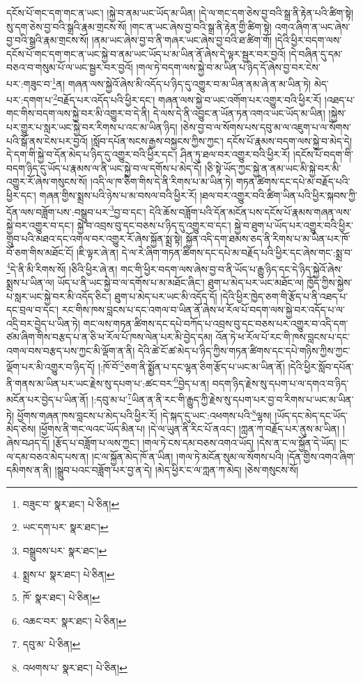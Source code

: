 དངོས་པོ་གང་དག་གང་ན་ཡང་། །སྐྱེ་བ་ནམ་ཡང་ཡོད་མ་ཡིན། །དེ་ལ་གང་དག་ཅེས་བྱ་བའི་སྒྲ་ནི་རྟེན་པའི་ཚིག་སྟེ། སུ་དག་ཅེས་བྱ་བའི་སྒྲའི་རྣམ་གྲངས་སོ། །གང་ན་ཡང་ཞེས་བྱ་བའི་སྒྲ་ནི་རྟེན་གྱི་ཚིག་སྟེ། འགའ་ཞིག་ན་ཡང་ཞེས་བྱ་བའི་སྒྲའི་རྣམ་གྲངས་སོ། །ནམ་ཡང་ཞེས་བྱ་བ་ནི་གཞར་ཡང་ཞེས་བྱ་བའི་ཐ་ཚིག་གོ། །དེའི་ཕྱིར་བདག་ལས་དངོས་པོ་གང་དག་གང་ན་ཡང་སྐྱེ་བ་ནམ་ཡང་ཡོད་པ་མ་ཡིན་ནོ་ཞེས་དེ་ལྟར་སྦྱར་བར་བྱའོ། །དེ་བཞིན་དུ་དམ་བཅའ་བ་གསུམ་པོ་ལ་ཡང་སྦྱར་བར་བྱའོ། །གལ་ཏེ་བདག་ལས་སྐྱེ་བ་མ་ཡིན་པ་ཉིད་དོ་ཞེས་བྱ་བར་ངེས་པར་:གཟུང་བ་\footnote{བཟུང་བ་  སྣར་ཐང་།  པེ་ཅིན། }ན། གཞན་ལས་སྐྱེའོ་ཞེས་མི་འདོད་པ་ཉིད་དུ་འགྱུར་བ་མ་ཡིན་ནམ་ཞེ་ན་མ་ཡིན་ཏེ། མེད་པར་:དགག་པ་\footnote{ཡང་དག་པར་  སྣར་ཐང་། }བརྗོད་པར་འདོད་པའི་ཕྱིར་དང་། གཞན་ལས་སྐྱེ་བ་ཡང་འགོག་པར་འགྱུར་བའི་ཕྱིར་རོ། །འཐད་པ་གང་གིས་བདག་ལས་སྐྱེ་བར་མི་འགྱུར་བ་དེ་ནི། དེ་ལས་དེ་ནི་འབྱུང་ན་ཡོན་ཏན་འགའ་ཡང་ཡོད་མ་ཡིན། །སྐྱེས་པར་གྱུར་པ་སླར་ཡང་སྐྱེ་བར་རིགས་པ་འང་མ་ཡིན་ཉིད། །ཅེས་བྱ་བ་ལ་སོགས་པས་དབུ་མ་ལ་འཇུག་པ་ལ་སོགས་པའི་སྒོ་ནས་ངེས་པར་བྱའོ། །སློབ་དཔོན་སངས་རྒྱས་བསྐྱངས་ཀྱིས་ཀྱང་། དངོས་པོ་རྣམས་བདག་ལས་སྐྱེ་བ་མེད་དེ། དེ་དག་གི་སྐྱེ་བ་དོན་མེད་པ་ཉིད་དུ་འགྱུར་བའི་ཕྱིར་དང་། ཤིན་ཏུ་ཐལ་བར་འགྱུར་བའི་ཕྱིར་རོ། །དངོས་པོ་བདག་གི་བདག་ཉིད་དུ་ཡོད་པ་རྣམས་ལ་ནི་ཡང་སྐྱེ་བ་ལ་དགོས་པ་མེད་དོ། །ཅི་སྟེ་ཡོད་ཀྱང་སྐྱེ་ན་ནམ་ཡང་མི་སྐྱེ་བར་མི་འགྱུར་རོ་ཞེས་གསུངས་སོ། །འདི་ལ་ཁ་ཅིག་གིས་དེ་ནི་རིགས་པ་མ་ཡིན་ཏེ། གཏན་ཚིགས་དང་དཔེ་མ་བརྗོད་པའི་ཕྱིར་དང་། གཞན་གྱིས་སྨྲས་པའི་ཉེས་པ་མ་བསལ་བའི་ཕྱིར་རོ། །ཐལ་བར་འགྱུར་བའི་ཚིག་ཡིན་པའི་ཕྱིར་སྐབས་ཀྱི་དོན་ལས་བཟློག་པས་:བསྒྲུབ་པར་\footnote{བསྒྲུབས་པར་  སྣར་ཐང་། }བྱ་བ་དང་། དེའི་ཆོས་བཟློག་པའི་དོན་མངོན་པས་དངོས་པོ་རྣམས་གཞན་ལས་སྐྱེ་བར་འགྱུར་བ་དང་། སྐྱེ་བ་འབྲས་བུ་དང་བཅས་པ་ཉིད་དུ་འགྱུར་བ་དང་། སྐྱེ་བ་ཐུག་པ་ཡོད་པར་འགྱུར་བའི་ཕྱིར་གྲུབ་པའི་མཐའ་དང་འགལ་བར་འགྱུར་རོ་ཞེས་སྐྱོན་སྨྲ་སྟེ། སྐྱོན་འདི་དག་ཐམས་ཅད་ནི་རིགས་པ་མ་ཡིན་པར་ཁོ་བོ་ཅག་གིས་མཐོང་ངོ། །ཇི་ལྟར་ཞེ་ན། དེ་ལ་རེ་ཞིག་གཏན་ཚིགས་དང་དཔེ་མ་བརྗོད་པའི་ཕྱིར་དང་ཞེས་གང་:སྨྲ་བ་\footnote{སྨྲས་པ་  སྣར་ཐང་།  པེ་ཅིན། }དེ་ནི་མི་རིགས་སོ། །ཅིའི་ཕྱིར་ཞེ་ན། གང་གི་ཕྱིར་བདག་ལས་ཞེས་བྱ་བ་ནི་ཡོད་པ་རྒྱུ་ཉིད་དང་དེ་ཉིད་སྐྱེའོ་ཞེས་སྨྲས་པ་ཡིན་ལ། ཡོད་པ་ནི་ཡང་སྐྱེ་བ་ལ་དགོས་པ་མ་མཐོང་ཞིང་། ཐུག་པ་མེད་པར་ཡང་མཐོང་ལ། ཁྱོད་ཀྱིས་སྐྱེས་པ་སླར་ཡང་སྐྱེ་བར་མི་འདོད་ཅིང་། ཐུག་པ་མེད་པར་ཡང་མི་འདོད་དོ། །དེའི་ཕྱིར་ཁྱེད་ཅག་གི་རྩོད་པ་ནི་འཐད་པ་དང་བྲལ་བ་དང་། རང་གིས་ཁས་བླངས་པ་དང་འགལ་བ་ཡིན་ནོ་ཞེས་ཕ་རོལ་པོ་བདག་ལས་སྐྱེ་བར་འདོད་པ་ལ་འདྲི་བར་བྱེད་པ་ཡིན་ཏེ། གང་ལས་གཏན་ཚིགས་དང་དཔེ་བཀོད་པ་འབྲས་བུ་དང་བཅས་པར་འགྱུར་བ་འདི་དག་ཙམ་ཞིག་གིས་བརྩད་པ་ན་ཅི་ཕ་རོལ་པོ་ཁས་ལེན་པར་མི་བྱེད་དམ། འོན་ཏེ་ཕ་རོལ་པོ་རང་གི་ཁས་བླངས་པ་དང་འགལ་བས་བརྩད་པས་ཀྱང་མི་ལྡོག་ན་ནི། དེའི་ཚེ་ངོ་ཚ་མེད་པ་ཉིད་ཀྱིས་གཏན་ཚིགས་དང་དཔེ་གཉིས་ཀྱིས་ཀྱང་ལྡོག་པར་མི་འགྱུར་བ་ཉིད་དོ། །:ཁོ་བོ་\footnote{ཁོ་  སྣར་ཐང་།  པེ་ཅིན། }ཅག་ནི་སྨྱོན་པ་དང་ལྷན་ཅིག་རྩོད་པ་ཡང་མ་ཡིན་ནོ། །དེའི་ཕྱིར་སློབ་དཔོན་ནི་གནས་མ་ཡིན་པར་ཡང་རྗེས་སུ་དཔག་པ་:ཚང་བར་\footnote{འཆང་བར་  སྣར་ཐང་།  པེ་ཅིན། }བྱེད་པ་ན། བདག་ཉིད་རྗེས་སུ་དཔག་པ་ལ་དགའ་བ་ཉིད་མངོན་པར་བྱེད་པ་ཡིན་ནོ། །:དབུ་མ་པ་\footnote{དབུ་མ་  པེ་ཅིན། }ཡིན་ན་ནི་རང་གི་རྒྱུད་ཀྱི་རྗེས་སུ་དཔག་པར་བྱ་བ་རིགས་པ་ཡང་མ་ཡིན་ཏེ། ཕྱོགས་གཞན་ཁས་བླངས་པ་མེད་པའི་ཕྱིར་རོ། །དེ་སྐད་དུ་ཡང་:འཕགས་པའི་\footnote{འཕགས་པ་  སྣར་ཐང་།  པེ་ཅིན། }ལྷས། །ཡོད་དང་མེད་དང་ཡོད་མེད་ཅེས། །ཕྱོགས་ནི་གང་ལའང་ཡོད་མིན་པ། །དེ་ལ་ཡུན་ནི་རིང་པོ་ནའང་། །ཀླན་ཀ་བརྗོད་པར་ནུས་མ་ཡིན། །ཞེས་བཤད་དོ། །རྩོད་པ་བཟློག་པ་ལས་ཀྱང་། །གལ་ཏེ་ངས་དམ་བཅས་འགའ་ཡོད། །དེས་ན་ང་ལ་སྐྱོན་དེ་ཡོད། །ང་ལ་དམ་བཅའ་མེད་པས་ན། །ང་ལ་སྐྱོན་མེད་ཁོ་ན་ཡིན། །གལ་ཏེ་མངོན་སུམ་ལ་སོགས་པའི། །དོན་གྱིས་འགའ་ཞིག་དམིགས་ན་ནི། །སྒྲུབ་པའང་བཟློག་པར་བྱ་ན་དེ། །མེད་ཕྱིར་ང་ལ་ཀླན་ཀ་མེད། །ཅེས་གསུངས་སོ། 